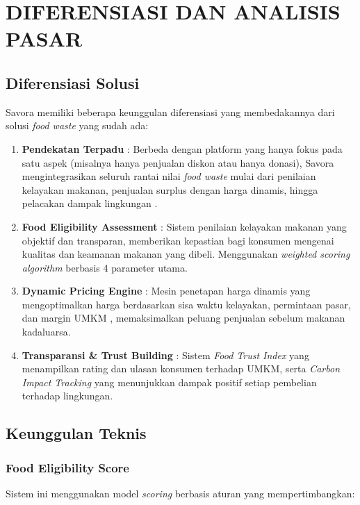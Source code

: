 \section{DIFERENSIASI DAN ANALISIS PASAR}

\subsection{Diferensiasi Solusi}

Savora memiliki beberapa keunggulan diferensiasi yang membedakannya dari solusi \textit{food waste} yang sudah ada:

\begin{enumerate}[leftmargin=*]
    \item \textbf{Pendekatan Terpadu} : Berbeda dengan platform yang hanya fokus pada satu aspek (misalnya hanya penjualan diskon atau hanya donasi), Savora mengintegrasikan seluruh rantai nilai \textit{food waste} mulai dari penilaian kelayakan makanan, penjualan surplus dengan harga dinamis, hingga pelacakan dampak lingkungan \cite{kusumawati2025mobile}\cite{mobilefoodwaste2024review}.
    
    \item \textbf{Food Eligibility Assessment} : Sistem penilaian kelayakan makanan yang objektif dan transparan, memberikan kepastian bagi konsumen mengenai kualitas dan keamanan makanan yang dibeli. Menggunakan \textit{weighted scoring algorithm} berbasis 4 parameter utama.
    
    \item \textbf{Dynamic Pricing Engine} : Mesin penetapan harga dinamis yang mengoptimalkan harga berdasarkan sisa waktu kelayakan, permintaan pasar, dan margin UMKM \cite{qlearning2026pricing}\cite{kayikci2024iot}, memaksimalkan peluang penjualan sebelum makanan kadaluarsa.
    
    \item \textbf{Transparansi \& Trust Building} : Sistem \textit{Food Trust Index} yang menampilkan rating dan ulasan konsumen terhadap UMKM, serta \textit{Carbon Impact Tracking} yang menunjukkan dampak positif setiap pembelian terhadap lingkungan.
\end{enumerate}

\subsection{Keunggulan Teknis}

\subsubsection{Food Eligibility Score}
Sistem ini menggunakan model \textit{scoring} berbasis aturan yang mempertimbangkan:

